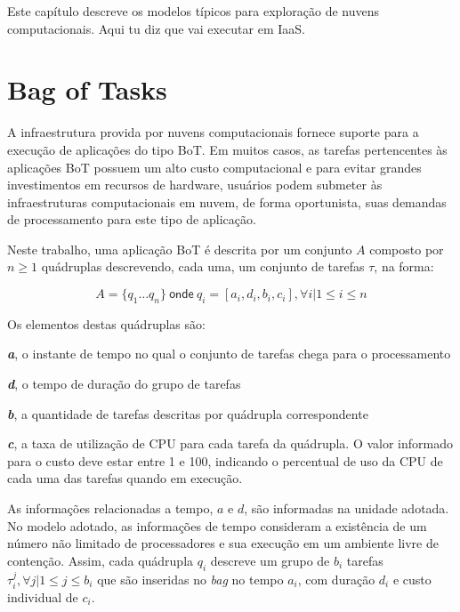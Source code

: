 \documentclass[tese,capa]{texufpel}
\begin{document}
Este capítulo descreve os modelos típicos para exploração de nuvens computacionais. Aqui tu diz que vai executar em IaaS. 

\section{Bag of Tasks}\label{sec:bag_of_tasks}

A infraestrutura provida por nuvens computacionais fornece suporte para a execução de aplicações do tipo BoT. Em muitos casos, as tarefas pertencentes às aplicações BoT possuem um alto custo computacional e para evitar grandes investimentos em recursos de hardware, usuários podem submeter às infraestruturas computacionais em nuvem, de forma oportunista, suas demandas de processamento para este tipo de aplicação.

Neste trabalho, uma aplicação BoT é descrita por um conjunto $A$ composto por $n \ge 1$ quádruplas descrevendo, cada uma, um conjunto de tarefas $\tau$, na forma:

\[
A = \{q_1 \dots q_n\} ~\textsf{onde}~ q_i = [a_i,d_i,b_i,c_i], \forall  i | 1 \le  i \le n
\]

Os elementos destas quádruplas são:
\begin{enumerate*}[itemjoin={{; }},itemjoin*={{; e }}]
	\item[]\textbf{\emph{a}}, o instante de tempo no qual o conjunto de tarefas chega para o processamento
	\item[]\textbf{\emph{d}}, o tempo de duração do grupo de tarefas
	\item[]\textbf{\emph{b}}, a quantidade de tarefas descritas por quádrupla correspondente
	\item[]\textbf{\emph{c}}, a taxa de utilização de CPU para cada tarefa da quádrupla. O valor informado para o custo deve estar entre 1 e 100, indicando o percentual de uso da CPU de cada uma das tarefas quando em execução.
\end{enumerate*}
As informações relacionadas a tempo, $a$ e $d$, são informadas na unidade adotada. No modelo adotado, as informações de tempo consideram a existência de um número não limitado de processadores e sua execução em um ambiente livre de contenção. Assim, cada quádrupla $q_i$ descreve um grupo de $b_i$ tarefas $\tau_i^j, \forall j | 1 \le j \le b_i$ que são inseridas no \textit{bag} no tempo $a_i$, com duração $d_i$ e custo individual de $c_i$.
\end{document}
